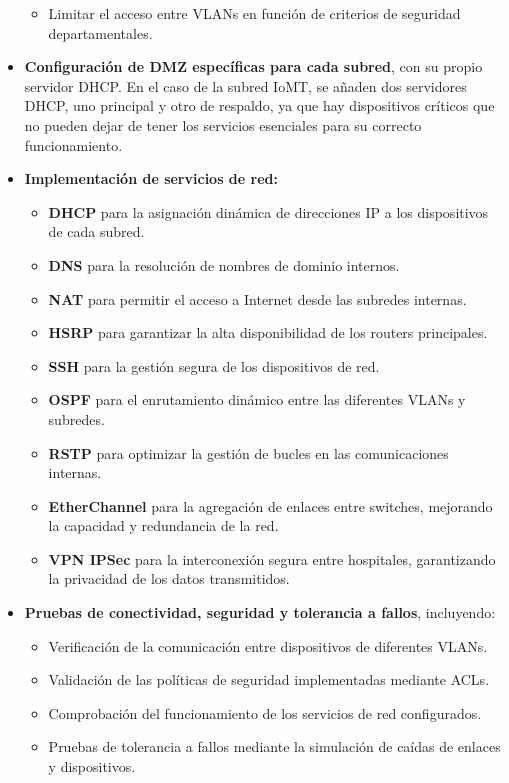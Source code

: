 \begin{itemize}
\begin{itemize}
        \item Limitar el acceso entre VLANs en función de criterios de seguridad departamentales.
    \end{itemize}
    \item \textbf{Configuración de \ac{DMZ} específicas para cada subred}, con su propio servidor \ac{DHCP}. En el caso de la subred IoMT, se añaden dos servidores DHCP, uno principal y 
    otro de respaldo, ya que hay dispositivos críticos que no pueden dejar de tener los servicios esenciales para su correcto funcionamiento.
    \item \textbf{Implementación de servicios de red:}
    \begin{itemize}
        \item \textbf{DHCP} para la asignación dinámica de direcciones IP a los dispositivos de cada subred.
        \item \textbf{\ac{DNS}} para la resolución de nombres de dominio internos.
        \item \textbf{\ac{NAT}} para permitir el acceso a Internet desde las subredes internas.
        \item \textbf{\ac{HSRP}} para garantizar la alta disponibilidad de los routers principales.
        \item \textbf{\ac{SSH}} para la gestión segura de los dispositivos de red.
        \item \textbf{\ac{OSPF}} para el enrutamiento dinámico entre las diferentes VLANs y subredes.
        \item \textbf{\ac{RSTP}} para optimizar la gestión de bucles en las comunicaciones internas.
        \item \textbf{EtherChannel} para la agregación de enlaces entre switches, mejorando la capacidad y redundancia de la red.
        \item \textbf{VPN IPSec} para la interconexión segura entre hospitales, garantizando la privacidad de los datos transmitidos.
    \end{itemize}
    \item \textbf{Pruebas de conectividad, seguridad y tolerancia a fallos}, incluyendo:
    \begin{itemize}
        \item Verificación de la comunicación entre dispositivos de diferentes VLANs.
        \item Validación de las políticas de seguridad implementadas mediante ACLs.
        \item Comprobación del funcionamiento de los servicios de red configurados.
        \item Pruebas de tolerancia a fallos mediante la simulación de caídas de enlaces y dispositivos.
    \end{itemize}
\end{itemize}

